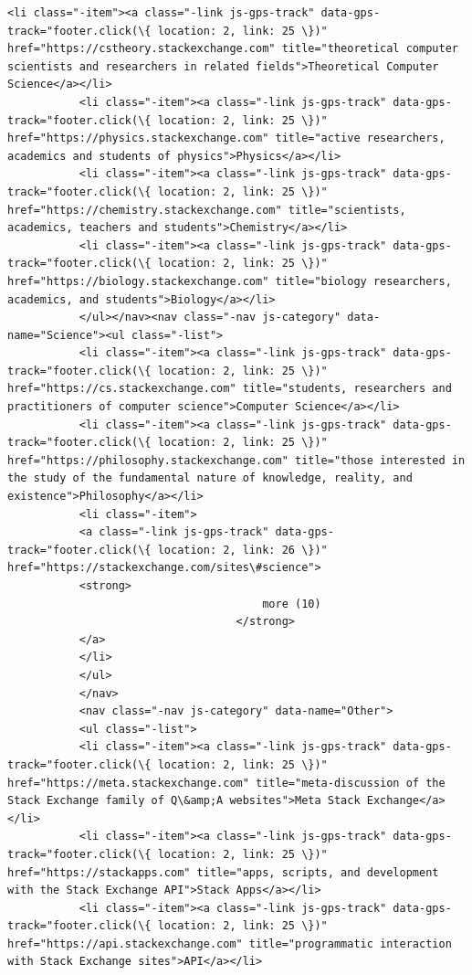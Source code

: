 \documentclass[11pt]{article}
\begin{document}
\begin{Verbatim}[commandchars=\\\{\}]
           <li class="-item"><a class="-link js-gps-track" data-gps-track="footer.click(\{ location: 2, link: 25 \})" href="https://cstheory.stackexchange.com" title="theoretical computer scientists and researchers in related fields">Theoretical Computer Science</a></li>
           <li class="-item"><a class="-link js-gps-track" data-gps-track="footer.click(\{ location: 2, link: 25 \})" href="https://physics.stackexchange.com" title="active researchers, academics and students of physics">Physics</a></li>
           <li class="-item"><a class="-link js-gps-track" data-gps-track="footer.click(\{ location: 2, link: 25 \})" href="https://chemistry.stackexchange.com" title="scientists, academics, teachers and students">Chemistry</a></li>
           <li class="-item"><a class="-link js-gps-track" data-gps-track="footer.click(\{ location: 2, link: 25 \})" href="https://biology.stackexchange.com" title="biology researchers, academics, and students">Biology</a></li>
           </ul></nav><nav class="-nav js-category" data-name="Science"><ul class="-list">
           <li class="-item"><a class="-link js-gps-track" data-gps-track="footer.click(\{ location: 2, link: 25 \})" href="https://cs.stackexchange.com" title="students, researchers and practitioners of computer science">Computer Science</a></li>
           <li class="-item"><a class="-link js-gps-track" data-gps-track="footer.click(\{ location: 2, link: 25 \})" href="https://philosophy.stackexchange.com" title="those interested in the study of the fundamental nature of knowledge, reality, and existence">Philosophy</a></li>
           <li class="-item">
           <a class="-link js-gps-track" data-gps-track="footer.click(\{ location: 2, link: 26 \})" href="https://stackexchange.com/sites\#science">
           <strong>
                                       more (10)
                                   </strong>
           </a>
           </li>
           </ul>
           </nav>
           <nav class="-nav js-category" data-name="Other">
           <ul class="-list">
           <li class="-item"><a class="-link js-gps-track" data-gps-track="footer.click(\{ location: 2, link: 25 \})" href="https://meta.stackexchange.com" title="meta-discussion of the Stack Exchange family of Q\&amp;A websites">Meta Stack Exchange</a></li>
           <li class="-item"><a class="-link js-gps-track" data-gps-track="footer.click(\{ location: 2, link: 25 \})" href="https://stackapps.com" title="apps, scripts, and development with the Stack Exchange API">Stack Apps</a></li>
           <li class="-item"><a class="-link js-gps-track" data-gps-track="footer.click(\{ location: 2, link: 25 \})" href="https://api.stackexchange.com" title="programmatic interaction with Stack Exchange sites">API</a></li>

\end{Verbatim}
\end{document}
